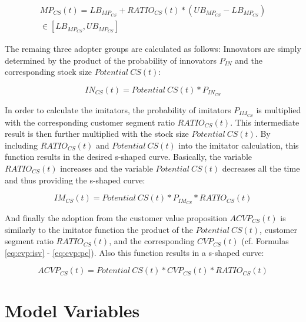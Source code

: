 \begin{eqnarray}\label{eq:cs:mp}
	MP_{CS}(t) = LB_{MP_{CS}} + RATIO_{CS}(t) * (UB_{MP_{CS}} - LB_{MP_{CS}})  \nonumber \\ \in [LB_{MP_{CS}},UB_{MP_{CS}}]
\end{eqnarray}

The remaing three adopter groups are calculated as follows: Innovators are simply determined by the product of the probability of innovators $P_{IN}$ and the corresponding stock size $\mathit{Potential~CS(t)}$:

\begin{equation}\label{eq:cs:in}
		IN_{CS}(t) = \mathit{Potential~CS(t)} * P_{IN_{CS}}
\end{equation}

In order to calculate the imitators, the probability of imitators $P_{IM_{CS}}$ is multiplied with the corresponding customer segment ratio $RATIO_{CS}(t)$. This intermediate result is then further multiplied with the stock size $\mathit{Potential~CS(t)}$. By including $RATIO_{CS}(t)$ and $\mathit{Potential~CS(t)}$ into the imitator calculation, this function results in the desired s-shaped curve. Basically, the variable $RATIO_{CS}(t)$ increases and the variable $\mathit{Potential~CS(t)}$ decreases all the time and thus providing the s-shaped curve:

\begin{equation}\label{eq:cs:im}
		IM_{CS}(t) = \mathit{Potential~CS(t)} * P_{IM_{CS}} * RATIO_{CS}(t)
\end{equation}

And finally the adoption from the customer value proposition $ACVP_{CS}(t)$ is similarly to the imitator function the product of the $\mathit{Potential~CS(t)}$, customer segment ratio $RATIO_{CS}(t)$, and the corresponding $CVP_{CS}(t)$ (cf. Formulas \ref{eq:cvp:isv} - \ref{eq:cvp:pc}). Also this function results in a s-shaped curve:

\begin{equation}\label{eq:cs:acvp}
		ACVP_{CS}(t) = \mathit{Potential~CS(t)} * CVP_{CS}(t) * RATIO_{CS}(t)
\end{equation}

\section{Model Variables}\label{ch:sfd:mv}

